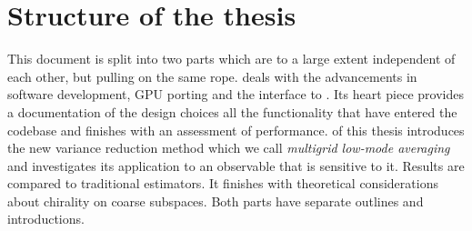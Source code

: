 \section{Structure of the thesis}

This document is split into two parts which are to a large extent independent of each other, but pulling on the same rope.
 deals with the advancements in software development, GPU porting and the interface to \quda.
Its heart piece provides a documentation of the design choices all the functionality that have entered the codebase and finishes with an assessment of performance.
 of this thesis introduces the new variance reduction method which we call \emph{multigrid low-mode averaging} and investigates its application to an observable that is sensitive to it.
Results are compared to traditional estimators.
It finishes with theoretical considerations about chirality on coarse subspaces.
Both parts have separate outlines and introductions.
